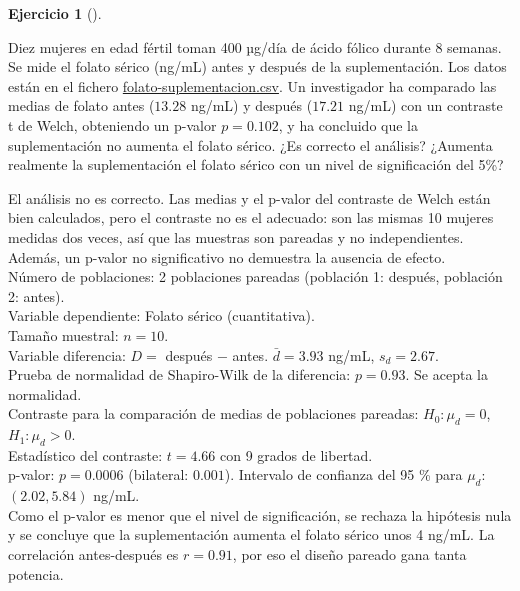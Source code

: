 \documentclass[
  spanish,
  a4paper,
]{scrreport}
\theoremstyle{definition}
\newtheorem{exercise}{Ejercicio}[chapter]
\theoremstyle{remark}
\begin{document}
\begin{tcolorbox}
\end{tcolorbox}

\begin{exercise}[]\protect\hypertarget{exr-contraste-ia-verificacion-folato}{}\label{exr-contraste-ia-verificacion-folato}

Diez mujeres en edad fértil toman 400 µg/día de ácido fólico durante 8
semanas. Se mide el folato sérico (ng/mL) antes y después de la
suplementación. Los datos están en el fichero
\href{datos/folato-suplementacion.csv}{folato-suplementacion.csv}. Un
investigador ha comparado las medias de folato antes (\(13.28\) ng/mL) y
después (\(17.21\) ng/mL) con un contraste t de Welch, obteniendo un
p-valor \(p=0.102\), y ha concluido que la suplementación no aumenta el
folato sérico. ¿Es correcto el análisis? ¿Aumenta realmente la
suplementación el folato sérico con un nivel de significación del 5\%?

\end{exercise}

\begin{tcolorbox}[enhanced jigsaw, arc=.35mm, bottomrule=.15mm, bottomtitle=1mm, breakable, colback=white, colbacktitle=quarto-callout-tip-color!10!white, colframe=quarto-callout-tip-color-frame, coltitle=black, left=2mm, leftrule=.75mm, opacityback=0, opacitybacktitle=0.6, rightrule=.15mm, title=\textcolor{quarto-callout-tip-color}{\faLightbulb}\hspace{0.5em}{Solución}, titlerule=0mm, toprule=.15mm, toptitle=1mm]

El análisis no es correcto. Las medias y el p-valor del contraste de
Welch están bien calculados, pero el contraste no es el adecuado: son
las mismas 10 mujeres medidas dos veces, así que las muestras son
pareadas y no independientes. Además, un p-valor no significativo no
demuestra la ausencia de efecto.\\
Número de poblaciones: 2 poblaciones pareadas (población 1: después,
población 2: antes).\\
Variable dependiente: Folato sérico (cuantitativa).\\
Tamaño muestral: \(n=10\).\\
Variable diferencia: \(D=\) después \(-\) antes. \(\bar d=3.93\) ng/mL,
\(s_d=2.67\).\\
Prueba de normalidad de Shapiro-Wilk de la diferencia: \(p=0.93\). Se
acepta la normalidad.\\
Contraste para la comparación de medias de poblaciones pareadas:
\(H_0:\mu_d=0\), \(H_1:\mu_d> 0\).\\
Estadístico del contraste: \(t=4.66\) con 9 grados de libertad.\\
p-valor: \(p=0.0006\) (bilateral: \(0.001\)). Intervalo de confianza del
95 \% para \(\mu_d\): \((2.02, 5.84)\) ng/mL.\\
Como el p-valor es menor que el nivel de significación, se rechaza la
hipótesis nula y se concluye que la suplementación aumenta el folato
sérico unos 4 ng/mL. La correlación antes-después es \(r=0.91\), por eso
el diseño pareado gana tanta potencia.

\end{tcolorbox}
\end{document}
